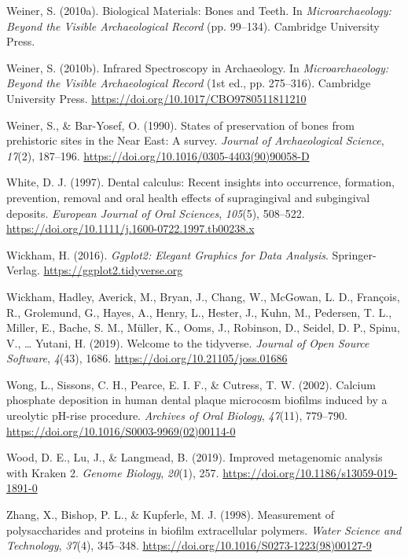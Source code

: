 \documentclass[
  letterpaper,
]{book}
\newlength{\cslhangindent}
\newlength{\cslentryspacingunit} %
\newenvironment{CSLReferences}[2] %
 {%
  \setlength{\parindent}{0pt}
  \ifodd #1
  \let\oldpar\par
  \def\par{\hangindent=\cslhangindent\oldpar}
  \fi
  \setlength{\parskip}{#2\cslentryspacingunit}
 }%
 {}
\begin{document}
\begin{CSLReferences}{1}{0}
\leavevmode{}%
Weiner, S. (2010a). Biological {Materials}: {Bones} and {Teeth}. In
\emph{Microarchaeology: {Beyond} the {Visible Archaeological Record}}
(pp. 99--134). {Cambridge University Press}.

\leavevmode{}%
Weiner, S. (2010b). Infrared {Spectroscopy} in {Archaeology}. In
\emph{Microarchaeology: {Beyond} the {Visible Archaeological Record}}
(1st ed., pp. 275--316). {Cambridge University Press}.
\url{https://doi.org/10.1017/CBO9780511811210}

\leavevmode{}%
Weiner, S., \& Bar-Yosef, O. (1990). States of preservation of bones
from prehistoric sites in the {Near East}: {A} survey. \emph{Journal of
Archaeological Science}, \emph{17}(2), 187--196.
\url{https://doi.org/10.1016/0305-4403(90)90058-D}

\leavevmode{}%
White, D. J. (1997). Dental calculus: Recent insights into occurrence,
formation, prevention, removal and oral health effects of supragingival
and subgingival deposits. \emph{European Journal of Oral Sciences},
\emph{105}(5), 508--522.
\url{https://doi.org/10.1111/j.1600-0722.1997.tb00238.x}

\leavevmode{}%
Wickham, H. (2016). \emph{Ggplot2: {Elegant Graphics} for {Data
Analysis}}. {Springer-Verlag}. \url{https://ggplot2.tidyverse.org}

\leavevmode{}%
Wickham, Hadley, Averick, M., Bryan, J., Chang, W., McGowan, L. D.,
François, R., Grolemund, G., Hayes, A., Henry, L., Hester, J., Kuhn, M.,
Pedersen, T. L., Miller, E., Bache, S. M., Müller, K., Ooms, J.,
Robinson, D., Seidel, D. P., Spinu, V., \ldots{} Yutani, H. (2019).
Welcome to the {tidyverse}. \emph{Journal of Open Source Software},
\emph{4}(43), 1686. \url{https://doi.org/10.21105/joss.01686}

\leavevmode{}%
Wong, L., Sissons, C. H., Pearce, E. I. F., \& Cutress, T. W. (2002).
Calcium phosphate deposition in human dental plaque microcosm biofilms
induced by a ureolytic {pH-rise} procedure. \emph{Archives of Oral
Biology}, \emph{47}(11), 779--790.
\url{https://doi.org/10.1016/S0003-9969(02)00114-0}

\leavevmode{}%
Wood, D. E., Lu, J., \& Langmead, B. (2019). Improved metagenomic
analysis with {Kraken} 2. \emph{Genome Biology}, \emph{20}(1), 257.
\url{https://doi.org/10.1186/s13059-019-1891-0}

\leavevmode{}%
Zhang, X., Bishop, P. L., \& Kupferle, M. J. (1998). Measurement of
polysaccharides and proteins in biofilm extracellular polymers.
\emph{Water Science and Technology}, \emph{37}(4), 345--348.
\url{https://doi.org/10.1016/S0273-1223(98)00127-9}

\end{CSLReferences}
\end{document}
